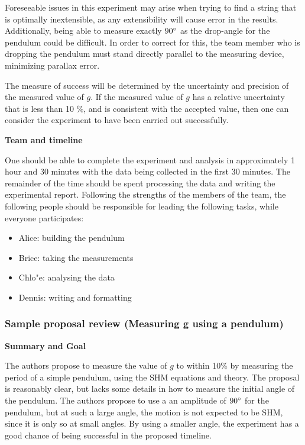 Foreseeable issues in this experiment may arise when trying to find a string that is optimally inextensible, as any extensibility will cause error in the results. Additionally, being able to measure exactly $90\degree$ as the drop-angle for the pendulum could be difficult. In order to correct for this, the team member who is dropping the pendulum must stand directly parallel to the measuring device, minimizing parallax error.

The measure of success will be determined by the uncertainty and precision of the measured value of $g$. If the measured value of $g$ has a relative uncertainty that is less than 10 \%, and is consistent with the accepted value, then one can consider the experiment to have been carried out successfully.

\textbf{Team and timeline}

One should be able to complete the experiment and analysis in approximately 1 hour and 30 minutes with the data being collected in the first 30 minutes. The remainder of the time should be spent processing the data and writing the experimental report.\newline
Following the strengths of the members of the team, the following people should be responsible for leading the following tasks, while everyone participates:

\begin{itemize}
\item Alice: building the pendulum
\item Brice: taking the measurements
\item Chlo"e: analysing the data
\item Dennis: writing and formatting
\end{itemize}

\subsubsection{Sample proposal review (Measuring g using a pendulum)}

\textbf{Summary and Goal}

The authors propose to measure the value of $g$ to within 10\% by measuring the period of a simple pendulum, using the SHM equations and theory. The proposal is reasonably clear, but lacks some details in how to measure the initial angle of the pendulum. The authors propose to use a an amplitude of $90\degree$ for the pendulum, but at such a large angle, the motion is not expected to be SHM, since it is only so at small angles. By using a smaller angle, the experiment has a good chance of being successful in the proposed timeline.

